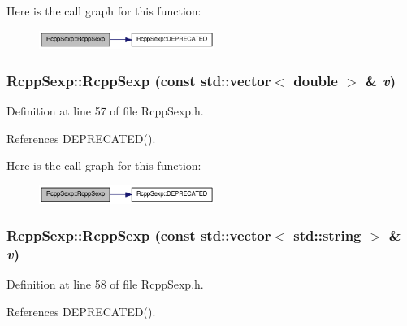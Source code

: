 Here is the call graph for this function:\nopagebreak
\begin{figure}[H]
\begin{center}
\leavevmode
\includegraphics[width=162pt]{classRcppSexp_ab276f77e2cc03da2d60d8826d095d757_cgraph}
\end{center}
\end{figure}
\hypertarget{classRcppSexp_addfe0bf529d5adc8cfd3729035676cf1}{
\subsubsection[{RcppSexp}]{\setlength{\rightskip}{0pt plus 5cm}RcppSexp::RcppSexp (const std::vector$<$ double $>$ \& {\em v})}}
\label{classRcppSexp_addfe0bf529d5adc8cfd3729035676cf1}


Definition at line 57 of file RcppSexp.h.

References DEPRECATED().

Here is the call graph for this function:\nopagebreak
\begin{figure}[H]
\begin{center}
\leavevmode
\includegraphics[width=162pt]{classRcppSexp_addfe0bf529d5adc8cfd3729035676cf1_cgraph}
\end{center}
\end{figure}
\hypertarget{classRcppSexp_a72d7ac372a23dcb2d8e7752afc7f07ac}{
\subsubsection[{RcppSexp}]{\setlength{\rightskip}{0pt plus 5cm}RcppSexp::RcppSexp (const std::vector$<$ std::string $>$ \& {\em v})}}
\label{classRcppSexp_a72d7ac372a23dcb2d8e7752afc7f07ac}


Definition at line 58 of file RcppSexp.h.

References DEPRECATED().

